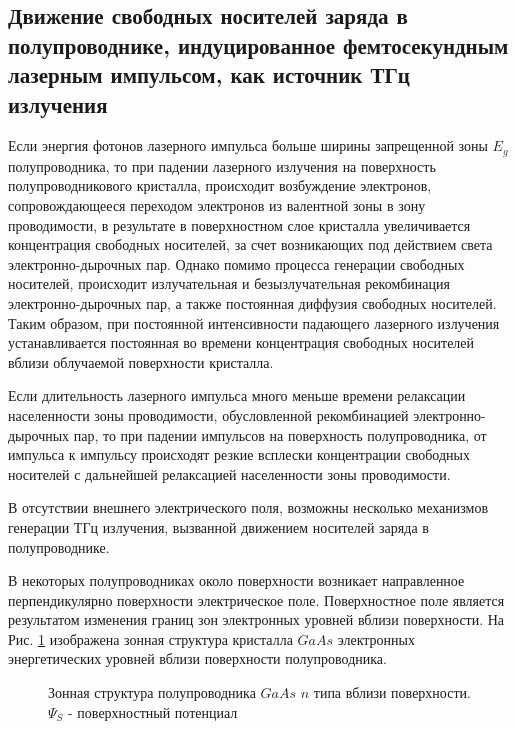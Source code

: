 \documentclass[a4paper,14pt,russian]{extreport}
\begin{document}
			\subsection{Движение свободных носителей заряда в полупроводнике, индуцированное фемтосекундным лазерным импульсом, как источник ТГц излучения}
				Если энергия фотонов лазерного импульса больше ширины запрещенной зоны $E_g$ полупроводника, то при падении лазерного излучения на поверхность полупроводникового кристалла, происходит возбуждение электронов, сопровождающееся переходом электронов из валентной зоны в зону проводимости, в результате в поверхностном слое кристалла увеличивается концентрация свободных носителей, за счет возникающих под действием света электронно-дырочных пар. Однако помимо процесса генерации свободных носителей, происходит излучательная и безызлучательная рекомбинация электронно-дырочных пар, а также постоянная диффузия свободных носителей. Таким образом, при постоянной интенсивности падающего лазерного излучения устанавливается постоянная во времени концентрация свободных носителей вблизи облучаемой поверхности кристалла.\par
				Если длительность лазерного импульса много меньше времени релаксации населенности зоны проводимости, обусловленной рекомбинацией электронно-дырочных пар, то при падении импульсов на поверхность полупроводника, от импульса к импульсу происходят резкие всплески концентрации свободных носителей с дальнейшей релаксацией населенности зоны проводимости.\par
				В отсутствии внешнего электрического поля, возможны несколько механизмов генерации ТГц излучения, вызванной движением носителей заряда в полупроводнике.\par
				В некоторых полупроводниках около поверхности возникает направленное перпендикулярно поверхности электрическое поле. Поверхностное поле является результатом изменения границ зон электронных уровней вблизи поверхности. На Рис.  \ref{ris:GaAsSurfFields} изображена зонная структура кристалла $GaAs$ электронных энергетических уровней вблизи поверхности полупроводника.
				\begin{figure}[h]
					\caption{Зонная структура полупроводника $GaAs$ $n$ типа вблизи поверхности. $\Psi_S$ - поверхностный потенциал}
				\label{ris:GaAsSurfFields}
				\end{figure}
\end{document}
